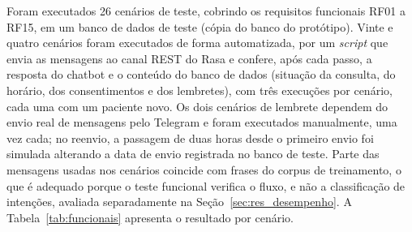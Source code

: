 \documentclass[12pt,a4paper]{extarticle}
\begin{document}
Foram executados 26 cenários de teste, cobrindo os requisitos funcionais RF01 a RF15, em um banco de dados de teste (cópia do banco do protótipo). Vinte e quatro cenários foram executados de forma automatizada, por um \textit{script} que envia as mensagens ao canal REST do Rasa e confere, após cada passo, a resposta do chatbot e o conteúdo do banco de dados (situação da consulta, do horário, dos consentimentos e dos lembretes), com três execuções por cenário, cada uma com um paciente novo. Os dois cenários de lembrete dependem do envio real de mensagens pelo Telegram e foram executados manualmente, uma vez cada; no reenvio, a passagem de duas horas desde o primeiro envio foi simulada alterando a data de envio registrada no banco de teste. Parte das mensagens usadas nos cenários coincide com frases do corpus de treinamento, o que é adequado porque o teste funcional verifica o fluxo, e não a classificação de intenções, avaliada separadamente na Seção~\ref{sec:res_desempenho}. A Tabela~\ref{tab:funcionais} apresenta o resultado por cenário.
\end{document}
